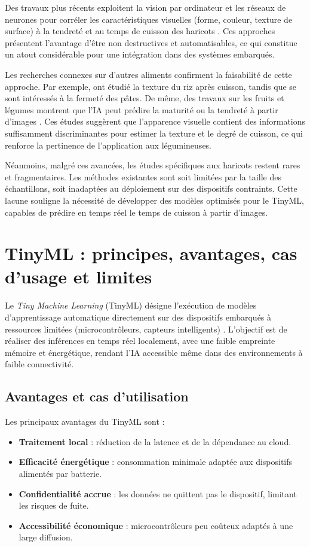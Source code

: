 Des travaux plus récents exploitent la vision par ordinateur et les réseaux de neurones pour corréler les caractéristiques visuelles (forme, couleur, texture de surface) à la tendreté et au temps de cuisson des haricots \cite{njoroge2021}. Ces approches présentent l’avantage d’être non destructives et automatisables, ce qui constitue un atout considérable pour une intégration dans des systèmes embarqués.

Les recherches connexes sur d’autres aliments confirment la faisabilité de cette approche. Par exemple, \cite{patindol2017} ont étudié la texture du riz après cuisson, tandis que \cite{foschia2015} se sont intéressés à la fermeté des pâtes. De même, des travaux sur les fruits et légumes montrent que l’IA peut prédire la maturité ou la tendreté à partir d’images \cite{kaur2020}. Ces études suggèrent que l’apparence visuelle contient des informations suffisamment discriminantes pour estimer la texture et le degré de cuisson, ce qui renforce la pertinence de l’application aux légumineuses.

Néanmoins, malgré ces avancées, les études spécifiques aux haricots restent rares et fragmentaires. Les méthodes existantes sont soit limitées par la taille des échantillons, soit inadaptées au déploiement sur des dispositifs contraints. Cette lacune souligne la nécessité de développer des modèles optimisés pour le TinyML, capables de prédire en temps réel le temps de cuisson à partir d’images.

\section{TinyML : principes, avantages, cas d’usage et limites}
Le \textit{Tiny Machine Learning} (TinyML) désigne l’exécution de modèles d’apprentissage automatique directement sur des dispositifs embarqués à ressources limitées (microcontrôleurs, capteurs intelligents) \cite{banbury2021}. L’objectif est de réaliser des inférences en temps réel localement, avec une faible empreinte mémoire et énergétique, rendant l’IA accessible même dans des environnements à faible connectivité.

\subsection{Avantages et cas d’utilisation}
Les principaux avantages du TinyML sont :
\begin{itemize}
	\item \textbf{Traitement local} : réduction de la latence et de la dépendance au cloud.
	\item \textbf{Efficacité énergétique} : consommation minimale adaptée aux dispositifs alimentés par batterie.
	\item \textbf{Confidentialité accrue} : les données ne quittent pas le dispositif, limitant les risques de fuite.
	\item \textbf{Accessibilité économique} : microcontrôleurs peu coûteux adaptés à une large diffusion.
\end{itemize}

